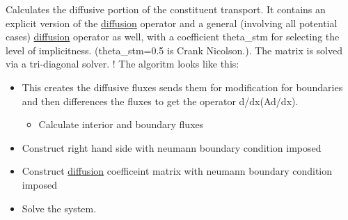 \label{a00056_b108f04e81c5fda27fe18ee2aa18086c}


Calculates the diffusive portion of the constituent transport. It contains an explicit version of the \hyperlink{a00056}{diffusion} operator and a general (involving all potential cases) \hyperlink{a00056}{diffusion} operator as well, with a coefficient theta\_\-stm for selecting the level of implicitness. (theta\_\-stm=0.5 is Crank Nicolson.). The matrix is solved via a tri-diagonal solver. ! The algoritm looks like this:\begin{itemize}
\item This creates the diffusive fluxes sends them for modification for boundaries and then differences the fluxes to get the operator d/dx(Ad/dx).\begin{itemize}
\item Calculate interior and boundary fluxes\end{itemize}
\item Construct right hand side with neumann boundary condition imposed\item Construct \hyperlink{a00056}{diffusion} coefficeint matrix with neumann boundary condition imposed\item Solve the system. \end{itemize}


